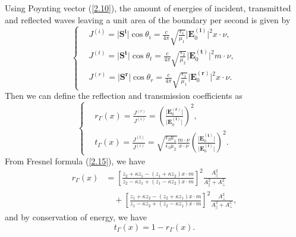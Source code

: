 \documentclass[a4paper,12pt,]{article}
\numberwithin{equation}{section}
\numberwithin{equation}{section} \allowdisplaybreaks
\begin{document}
Using Poynting vector (\ref{2.10}), the amount of energies of incident, transmitted and reflected waves leaving a unit area of the boundary per second is given by
\begin{equation*}
  \left\{
  \begin{split}
       & J^{(i)} = \vert \mathbf{S}^{\mathbf{i}} \vert \cos\theta_{i} = \frac{c}{4\pi} \sqrt{\frac{\epsilon_{1}}{\mu_{1}}} \vert \mathbf{E}_{0}^{(\mathbf{i})}\vert^{2} x \cdot \nu, \\
       & J^{(t)} = \vert \mathbf{S}^{\mathbf{t}} \vert \cos\theta_{t} = \frac{c}{4\pi} \sqrt{\frac{\epsilon_{2}}{\mu_{2}}} \vert \mathbf{E}_{0}^{(\mathbf{t})}\vert^{2} m \cdot \nu, \\
       & J^{(r)} = \vert \mathbf{S}^{\mathbf{r}} \vert \cos\theta_{r} = \frac{c}{4\pi} \sqrt{\frac{\epsilon_{1}}{\mu_{1}}} \vert \mathbf{E}_{0}^{(\mathbf{r})}\vert^{2} x \cdot \nu.
  \end{split}
  \right.
\end{equation*}
Then we can define the reflection and transmission coefficients as
\begin{equation*}
  \left\{
  \begin{split}
       & r_{\Gamma}(x) = \frac{J^{(r)}}{J^{(i)}} = \left(\frac{\vert \mathbf{E}_{0}^{(\mathbf{r})} \vert}{\vert \mathbf{E}_{0}^{(\mathbf{i})} \vert}\right)^{2}, \\
       & t_{\Gamma}(x) = \frac{J^{(t)}}{J^{(i)}} = \sqrt{\frac{\epsilon_{2}\mu_{1}}{\epsilon_{1}\mu_{2}}} \frac{m \cdot \nu}{x \cdot \nu}\left(\frac{\vert \mathbf{E}_{0}^{(\mathbf{t})} \vert}{\vert \mathbf{E}_{0}^{(\mathbf{i})}\vert}\right)^{2}.
  \end{split}
  \right.
\end{equation*}
From Fresnel formula (\ref{2.15}), we have
\begin{equation}\label{2.16}
  \begin{aligned}
  r_{\Gamma}(x) & = \left[ \frac{z_{2} + \kappa z_{1} - (z_{1} + \kappa z_{2}) x \cdot m}{z_{2} - \kappa z_{1} + (z_{1} - \kappa z_{2}) x \cdot m} \right]^{2} \frac{A_{\parallel}^{2}}{A_{\parallel}^{2} + A_{\bot}^{2}} \\
  & \quad + \left[ \frac{z_{1} + \kappa z_{2} - (z_{2} + \kappa z_{1}) x \cdot m}{z_{1} - \kappa z_{2} + (z_{2} - \kappa z_{1}) x \cdot m} \right]^{2} \frac{A_{\bot}^{2}}{A_{\parallel}^{2} + A_{\bot}^{2}},
  \end{aligned}
\end{equation}
and by conservation of energy, we have
\begin{equation}\label{2.17}
  t_{\Gamma}(x) = 1 - r_{\Gamma}(x).
\end{equation}
\end{document}
